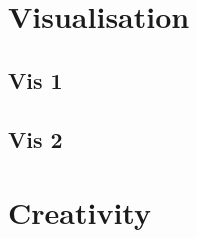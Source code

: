 \documentclass[a4paper,11pt]{article}
\begin{document}
\section*{Visualisation}

\subsection*{Vis 1}

\subsection*{Vis 2}

\section*{Creativity}
\end{document}
